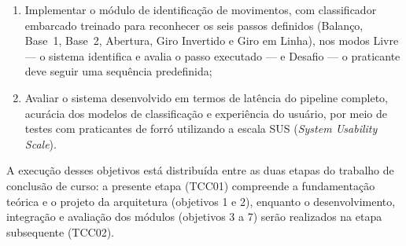 \begin{enumerate}
    \item Implementar o módulo de identificação de movimentos, com
    classificador embarcado treinado para reconhecer os seis passos definidos
    (Balanço, Base~1, Base~2, Abertura, Giro Invertido e Giro em Linha), nos
    modos Livre --- o sistema identifica e avalia o passo executado --- e
    Desafio --- o praticante deve seguir uma sequência predefinida;

    \item Avaliar o sistema desenvolvido em termos de latência do pipeline
    completo, acurácia dos modelos de classificação e experiência do usuário,
    por meio de testes com praticantes de forró utilizando a escala SUS
    (\textit{System Usability Scale}).
\end{enumerate}

A execução desses objetivos está distribuída entre as duas etapas do
trabalho de conclusão de curso: a presente etapa (TCC01) compreende a
fundamentação teórica e o projeto da arquitetura (objetivos 1 e 2), enquanto
o desenvolvimento, integração e avaliação dos módulos (objetivos 3 a 7) serão
realizados na etapa subsequente (TCC02).
